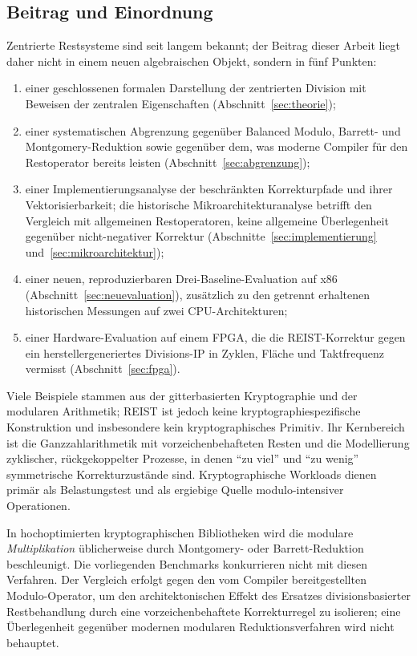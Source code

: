 \documentclass[11pt,a4paper]{scrartcl}
\theoremstyle{definition}
\theoremstyle{plain}
\theoremstyle{remark}
\begin{document}
\subsection{Beitrag und Einordnung}

Zentrierte Restsysteme sind seit langem bekannt; der Beitrag dieser Arbeit liegt daher nicht in einem neuen algebraischen Objekt, sondern in fünf Punkten:

\begin{enumerate}
\item einer geschlossenen formalen Darstellung der zentrierten Division mit Beweisen der zentralen Eigenschaften (Abschnitt~\ref{sec:theorie});
\item einer systematischen Abgrenzung gegenüber Balanced Modulo, Barrett- und Montgomery-Reduktion sowie gegenüber dem, was moderne Compiler für den Restoperator bereits leisten (Abschnitt~\ref{sec:abgrenzung});
\item einer Implementierungsanalyse der beschränkten Korrekturpfade und ihrer
Vektorisierbarkeit; die historische Mikroarchitekturanalyse betrifft den
Vergleich mit allgemeinen Restoperatoren, keine allgemeine Überlegenheit
gegenüber nicht-negativer Korrektur (Abschnitte~\ref{sec:implementierung}
und~\ref{sec:mikroarchitektur});
\item einer neuen, reproduzierbaren Drei-Baseline-Evaluation auf x86
(Abschnitt~\ref{sec:neuevaluation}), zusätzlich zu den getrennt erhaltenen
historischen Messungen auf zwei CPU-Architekturen;
\item einer Hardware-Evaluation auf einem FPGA, die die REIST-Korrektur gegen ein herstellergeneriertes Divisions-IP in Zyklen, Fläche und Taktfrequenz vermisst \cite{fpgarepo} (Abschnitt~\ref{sec:fpga}).
\end{enumerate}

Viele Beispiele stammen aus der gitterbasierten Kryptographie und der modularen Arithmetik; REIST ist jedoch keine kryptographiespezifische Konstruktion und insbesondere kein kryptographisches Primitiv. Ihr Kernbereich ist die Ganzzahlarithmetik mit vorzeichenbehafteten Resten und die Modellierung zyklischer, rückgekoppelter Prozesse, in denen \enquote{zu viel} und \enquote{zu wenig} symmetrische Korrekturzustände sind. Kryptographische Workloads dienen primär als Belastungstest und als ergiebige Quelle modulo-intensiver Operationen.

In hochoptimierten kryptographischen Bibliotheken wird die modulare \emph{Multiplikation} üblicherweise durch Montgomery- \cite{montgomery} oder Barrett-Reduktion \cite{barrett} beschleunigt. Die vorliegenden Benchmarks konkurrieren nicht mit diesen Verfahren. Der Vergleich erfolgt gegen den vom Compiler bereitgestellten Modulo-Operator, um den architektonischen Effekt des Ersatzes divisionsbasierter Restbehandlung durch eine vorzeichenbehaftete Korrekturregel zu isolieren; eine Überlegenheit gegenüber modernen modularen Reduktionsverfahren wird nicht behauptet.
\end{document}
